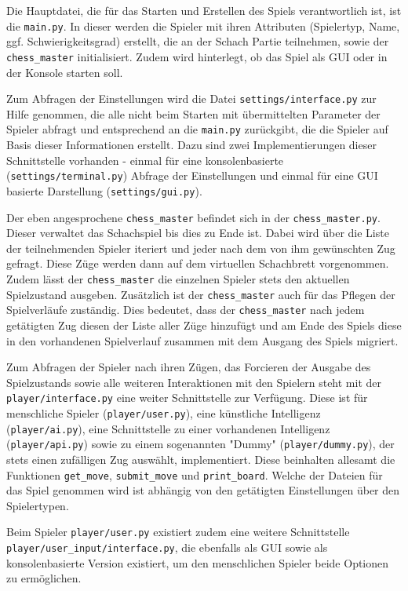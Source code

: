 Die Hauptdatei, die für das Starten und Erstellen des Spiels
verantwortlich ist, ist die \texttt{main.py}. In dieser werden die
Spieler mit ihren Attributen (Spielertyp, Name, ggf. Schwierigkeitsgrad)
erstellt, die an der Schach Partie teilnehmen, sowie der
\texttt{chess\_master} initialisiert. Zudem wird hinterlegt, ob das
Spiel als GUI oder in der Konsole starten soll.

Zum Abfragen der Einstellungen wird die Datei
\texttt{settings/interface.py} zur Hilfe genommen, die alle nicht beim
Starten mit übermittelten Parameter der Spieler abfragt und entsprechend
an die \texttt{main.py} zurückgibt, die die Spieler auf Basis dieser
Informationen erstellt. Dazu sind zwei Implementierungen dieser
Schnittstelle vorhanden - einmal für eine konsolenbasierte
(\texttt{settings/terminal.py}) Abfrage der Einstellungen und einmal für
eine GUI basierte Darstellung (\texttt{settings/gui.py}).

Der eben angesprochene \texttt{chess\_master} befindet sich in der
\texttt{chess\_master.py}. Dieser verwaltet das Schachspiel bis dies zu
Ende ist. Dabei wird über die Liste der teilnehmenden Spieler iteriert
und jeder nach dem von ihm gewünschten Zug gefragt. Diese Züge werden
dann auf dem virtuellen Schachbrett vorgenommen. Zudem lässt der
\texttt{chess\_master} die einzelnen Spieler stets den aktuellen
Spielzustand ausgeben. Zusätzlich ist der \texttt{chess\_master} auch
für das Pflegen der Spielverläufe zuständig. Dies bedeutet, dass der
\texttt{chess\_master} nach jedem getätigten Zug diesen der Liste aller
Züge hinzufügt und am Ende des Spiels diese in den vorhandenen
Spielverlauf zusammen mit dem Ausgang des Spiels migriert.

Zum Abfragen der Spieler nach ihren Zügen, das Forcieren der Ausgabe des
Spielzustands sowie alle weiteren Interaktionen mit den Spielern steht
mit der \texttt{player/interface.py} eine weiter Schnittstelle zur
Verfügung. Diese ist für menschliche Spieler (\texttt{player/user.py}),
eine künstliche Intelligenz (\texttt{player/ai.py}), eine Schnittstelle
zu einer vorhandenen Intelligenz (\texttt{player/api.py}) sowie zu einem
sogenannten "Dummy" (\texttt{player/dummy.py}), der stets einen
zufälligen Zug auswählt, implementiert. Diese beinhalten allesamt die
Funktionen \texttt{get\_move}, \texttt{submit\_move} und
\texttt{print\_board}. Welche der Dateien für das Spiel genommen wird
ist abhängig von den getätigten Einstellungen über den Spielertypen.

Beim Spieler \texttt{player/user.py} existiert zudem eine weitere
Schnittstelle \texttt{player/user\_input/interface.py}, die ebenfalls
als GUI sowie als konsolenbasierte Version existiert, um den
menschlichen Spieler beide Optionen zu ermöglichen.

